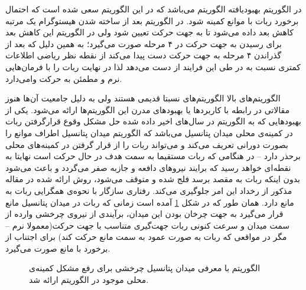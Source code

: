 در الگوریتم  بهبودیافته الگوریتم  می‌باشد که در این الگوریتم سعی شده است که احتمال برخورد ربات با موانع کمینه شود. در الگوریتم  بعد از ساخته شدن هیستوگرام یک مرتبه کاهش بعد داده می‌شود تا به جهت حرکت تعیین شود ولی در الگوریتم  این کاهش بعد برای رسیدن به جهت حرکت در ۴ مرحله صورت می‌گیرد؛ به همین دلیل که  بعد از گذراندن ۴ مرحله به جهت حرکت دست پیدا می‌کند از نقطه نظر ریاضی اطلاعات کمتری نسبت به  در طی این فرایند از دست می‌دهد لذا در نهایت ربات را با فرمان‌هایی نرم و مطمئن به حرکت وامی‌دارد.

الگوریتم‌های بالا الگوریتم‌های نسبتا قدیمی هستند ولی به دلیل جامعیت آن‌ها هنوز مقالاتی در رابطه با کاربردها یا بهبودهای مدرن این الگوریتم‌ها ارائه می‌شود. یکی از بهبودهایی که به الگوریتم  در سال‌های اخیر داده شده حل مشکل وقوع قرارگرفتن ربات در کمینه‌ی محلی میدان پتانسیل می‌باشد که الگوریتم  میدان پتانسیل اطراف موانع را بصورت دورانی تعریف می‌کند و می‌تواند ربات را از قرار گرفتن در کمینه‌های محلی برحذر دارد -- در هنگامی که ربات مستقیما به سمت هدف در حال حرکت است نهایتا به نقطه‌ای خواهد رسید که برایند نیروهای دافعه و جازبه صفر می‌گردد و باعث می‌شود بدون اینکه ربات به مقصد برسد فلج شده و متوقف می‌شود، روش ارائه شده در مقاله مذکور از رخداد این امر جلوگیری می‌کند.  رفتاری سازگار با نحوه‌ی همگرایی ربات به مانع دارد. همان طور که در شکل \ref{fig:apf} آمده است زمانی که ربات در میدان پتانسیل مانع قرار می‌گیرد به جهت چرخان بودن این میدان، برآیندی از نیروی چرخشی وارده از سمت میدان و سرعت کنونی ربات جهت‌گیری متناسب با جهت حرکت(معمولا نرم -- مگر در مواقعی که ربات به صورت عمود به سمت مانع حرکت کند) برای اجتناب از برخورد با مانع صورت می‌گیرد.

\begin{figure}
\centering
{}
\caption{الگوریتم  با معرفی میدان پتانسیل چرخشی برای رفع مشکل کمینه‌ی محلی موجود در الگوریتم  ارائه شد.}
\label{fig:apf}
\end{figure}
